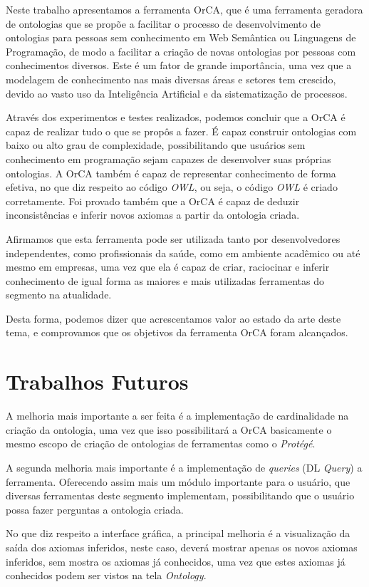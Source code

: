 \documentclass{bcc}
\begin{document}
Neste trabalho apresentamos a ferramenta OrCA, que é uma ferramenta geradora de ontologias que se propõe a facilitar o processo de desenvolvimento de ontologias para pessoas sem conhecimento em Web Semântica ou Linguagens de Programação, de modo a facilitar a criação de novas ontologias por pessoas com conhecimentos diversos. Este é um fator de grande importância, uma vez que a modelagem de conhecimento nas mais diversas áreas e setores tem crescido, devido ao vasto uso da Inteligência Artificial e da sistematização de processos.

Através dos experimentos e testes realizados, podemos concluir que a OrCA é capaz de realizar tudo o que se propôs a fazer. É capaz construir ontologias com baixo ou alto grau de complexidade, possibilitando que usuários sem conhecimento em programação sejam capazes de desenvolver suas próprias ontologias. A OrCA também é capaz de representar conhecimento de forma efetiva, no que diz respeito ao código \textit{OWL}, ou seja, o código \textit{OWL} é criado corretamente. Foi provado também que a OrCA é capaz de deduzir inconsistências e inferir novos axiomas a partir da ontologia criada.

Afirmamos que esta ferramenta pode ser utilizada tanto por desenvolvedores independentes, como profissionais da saúde, como em ambiente acadêmico ou até mesmo em empresas, uma vez que ela é capaz de criar, raciocinar e inferir conhecimento de igual forma as maiores e mais utilizadas ferramentas do segmento na atualidade.

Desta forma, podemos dizer que acrescentamos valor ao estado da arte deste tema, e comprovamos que os objetivos da ferramenta OrCA foram alcançados. 

\section{Trabalhos Futuros}
A melhoria mais importante a ser feita é a implementação de cardinalidade na criação da ontologia, uma vez que isso possibilitará a OrCA basicamente o mesmo escopo de criação de ontologias de ferramentas como o \textit{Protégé}.

A segunda melhoria mais importante é a implementação de \textit{queries} (DL \textit{Query}) a ferramenta. Oferecendo assim mais um módulo importante para o usuário, que diversas ferramentas deste segmento implementam, possibilitando que o usuário possa fazer perguntas a ontologia criada.

No que diz respeito a interface gráfica, a principal melhoria é a visualização da saída dos axiomas inferidos, neste caso, deverá mostrar apenas os novos axiomas inferidos, sem mostra os axiomas já conhecidos, uma vez que estes axiomas já conhecidos podem ser vistos na tela \textit{Ontology}.
\end{document}
